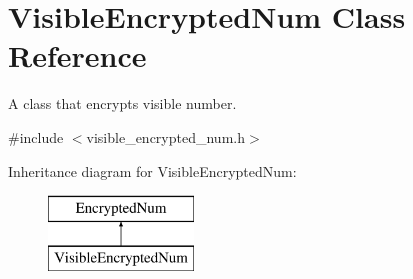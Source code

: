 \hypertarget{class_visible_encrypted_num}{}\section{Visible\+Encrypted\+Num Class Reference}
\label{class_visible_encrypted_num}


A class that encrypts visible number.  




{\ttfamily \#include $<$visible\+\_\+encrypted\+\_\+num.\+h$>$}

Inheritance diagram for Visible\+Encrypted\+Num\+:\begin{figure}[H]
\begin{center}
\leavevmode
\includegraphics[height=2.000000cm]{class_visible_encrypted_num}
\end{center}
\end{figure}
